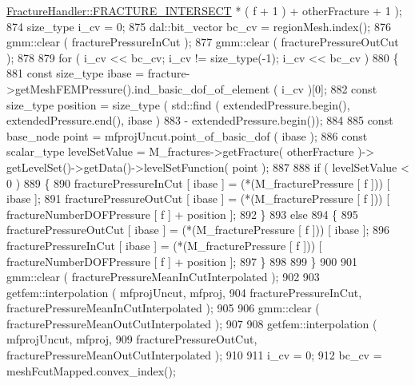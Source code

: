 \begin{DoxyCode}
      \hyperlink{classFractureHandler_a495ad4fc72d0c47c8f0424842f1153aaa781cae3f3b99bf9357fed2833d315537}{FractureHandler::FRACTURE\_INTERSECT} * ( f + 1 ) + otherFracture + 1 );
874                 size\_type i\_cv = 0;
875                 dal::bit\_vector bc\_cv = regionMesh.index();
876                 gmm::clear ( fracturePressureInCut );
877                 gmm::clear ( fracturePressureOutCut );
878 
879                 \textcolor{keywordflow}{for} ( i\_cv << bc\_cv; i\_cv != size\_type(-1); i\_cv << bc\_cv )
880                 \{
881                     \textcolor{keyword}{const} size\_type ibase = fracture->getMeshFEMPressure().ind\_basic\_dof\_of\_element ( i\_cv 
      )[0];
882                     \textcolor{keyword}{const} size\_type position = size\_type ( std::find ( extendedPressure.begin(), 
      extendedPressure.end(), ibase )
883                                                 - extendedPressure.begin());
884 
885                     \textcolor{keyword}{const} base\_node point = mfprojUncut.point\_of\_basic\_dof ( ibase );
886                     \textcolor{keyword}{const} scalar\_type levelSetValue = M\_fractures->getFracture( otherFracture )->
      getLevelSet()->getData()->levelSetFunction( point );
887 
888                     \textcolor{keywordflow}{if} ( levelSetValue < 0 )
889                     \{
890                         fracturePressureInCut [ ibase ] = (*(M\_fracturePressure [ f ])) [ ibase ];
891                         fracturePressureOutCut [ ibase ] = (*(M\_fracturePressure [ f ])) [ 
      fractureNumberDOFPressure [ f ] + position ];
892                     \}
893                     \textcolor{keywordflow}{else}
894                     \{
895                         fracturePressureOutCut [ ibase ] = (*(M\_fracturePressure [ f ])) [ ibase ];
896                         fracturePressureInCut [ ibase ] = (*(M\_fracturePressure [ f ])) [ 
      fractureNumberDOFPressure [ f ] + position ];
897                     \}
898 
899                 \}
900 
901                 gmm::clear ( fracturePressureMeanInCutInterpolated );
902 
903                 getfem::interpolation ( mfprojUncut, mfproj,
904                                         fracturePressureInCut, fracturePressureMeanInCutInterpolated );
905 
906                 gmm::clear ( fracturePressureMeanOutCutInterpolated );
907 
908                 getfem::interpolation ( mfprojUncut, mfproj,
909                                         fracturePressureOutCut, fracturePressureMeanOutCutInterpolated );
910 
911                 i\_cv = 0;
912                 bc\_cv = meshFcutMapped.convex\_index();

\end{DoxyCode}
